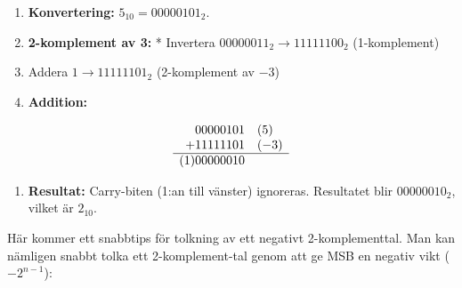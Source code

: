 \documentclass[
  swedish,
  letterpaper,
  oneside,
  openany]{book}
\providecommand{\tightlist}{%
  \setlength{\itemsep}{0pt}\setlength{\parskip}{0pt}}
\begin{document}
\begin{tcolorbox}[enhanced jigsaw, arc=.35mm, bottomrule=.15mm, bottomtitle=1mm, breakable, colback=white, colbacktitle=quarto-callout-note-color!10!white, colframe=quarto-callout-note-color-frame, coltitle=black, left=2mm, leftrule=.75mm, opacityback=0, opacitybacktitle=0.6, rightrule=.15mm, title=\textcolor{quarto-callout-note-color}{\faInfo}\hspace{0.5em}{Exempel: Subtraktion \(5_{10} - 3_{10}\) i 8-bitars 2-komplement}, titlerule=0mm, toprule=.15mm, toptitle=1mm]

\begin{enumerate}
\def\labelenumi{\arabic{enumi}.}
\tightlist
\item
  \textbf{Konvertering:} \(5_{10} = 00000101_2\).
\item
  \textbf{2-komplement av 3:} * Invertera
  \(00000011_2 \rightarrow 11111100_2\) (1-komplement)
\item
  Addera \(1 \rightarrow 11111101_2\) (2-komplement av \(-3\))
\item
  \textbf{Addition:}
\end{enumerate}

\[
\begin{array}{r@{\quad}l}
   00000101 & (5) \\
+  11111101 & (-3) \\
\hline
(1)00000010 & 
\end{array}
\]

\begin{enumerate}
\def\labelenumi{\arabic{enumi}.}
\setcounter{enumi}{3}
\tightlist
\item
  \textbf{Resultat:} Carry-biten (1:an till vänster) ignoreras.
  Resultatet blir \(00000010_2\), vilket är \(2_{10}\).
\end{enumerate}

\end{tcolorbox}

Här kommer ett snabbtips för tolkning av ett negativt 2-komplementtal.
Man kan nämligen snabbt tolka ett 2-komplement-tal genom att ge MSB en
negativ vikt (\(-2^{n-1}\)):
\end{document}
